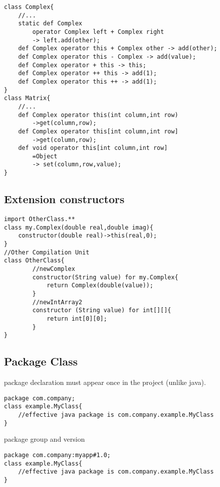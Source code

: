 \documentclass{tufte-book}
\begin{document}
                \begin{lstlisting}
class Complex{
    //...
    static def Complex 
        operator Complex left + Complex right 
        -> left.add(other);
    def Complex operator this + Complex other -> add(other);
    def Complex operator this - Complex -> add(value);
    def Complex operator + this -> this;
    def Complex operator ++ this -> add(1);
    def Complex operator this ++ -> add(1);
}
class Matrix{
    //...
    def Complex operator this(int column,int row)
        ->get(column,row);
    def Complex operator this[int column,int row]
        ->get(column,row);
    def void operator this[int column,int row]
        =Object
        -> set(column,row,value);
}
                \end{lstlisting}

            
            \subsection{Extension constructors}
            \begin{lstlisting}
import OtherClass.**
class my.Complex(double real,double imag){
    constructor(double real)->this(real,0);
}
//Other Compilation Unit
class OtherClass{
        //newComplex
        constructor(String value) for my.Complex{
            return Complex(double(value));
        }
        //newIntArray2
        constructor (String value) for int[][]{
            return int[0][0];
        }
}
            \end{lstlisting}


            \subsection{Package Class}
            package declaration must appear once in the project (unlike java).
            \begin{lstlisting}
package com.company;
class example.MyClass{
    //effective java package is com.company.example.MyClass
}
            \end{lstlisting}


            package group and version
            \begin{lstlisting}
package com.company:myapp#1.0;
class example.MyClass{
    //effective java package is com.company.example.MyClass
}
            \end{lstlisting}
\end{document}
